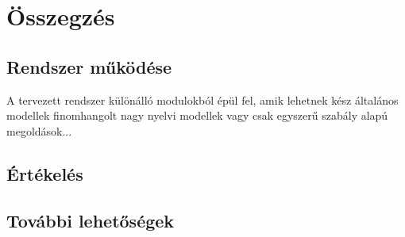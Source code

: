 \chapter{Összegzés}

\section{Rendszer működése}

A tervezett rendszer különálló modulokból épül fel, amik lehetnek kész általános modellek finomhangolt nagy nyelvi modellek vagy csak egyszerű szabály alapú megoldások...

\section{Értékelés}

\section{További lehetőségek}

